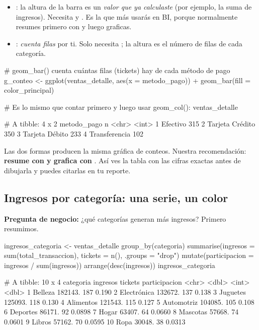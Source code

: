 \begin{itemize}
  \item {}: la altura de la barra es un \emph{valor que ya
        calculaste} (por ejemplo, la suma de ingresos). Necesita 
        y . Es la que más usarás en BI, porque normalmente
        resumes primero con  y luego graficas.
  \item {}: \emph{cuenta filas} por ti. Solo necesita
        ; la altura es el número de filas de cada categoría.
\end{itemize}

\begin{rcode}
# geom_bar() cuenta cuántas filas (tickets) hay de cada método de pago
g_conteo <- ggplot(ventas_detalle, aes(x = metodo_pago)) +
  geom_bar(fill = color_principal)

# Es lo mismo que contar primero y luego usar geom_col():
ventas_detalle %
\end{rcode}
\begin{rsalida}
# A tibble: 4 x 2
  metodo_pago         n
  <chr>           <int>
1 Efectivo          315
2 Tarjeta Crédito   350
3 Tarjeta Débito    233
4 Transferencia     102
\end{rsalida}

Las dos formas producen la misma gráfica de conteos. Nuestra recomendación:
\textbf{resume con  y grafica con }. Así
ves la tabla con las cifras exactas antes de dibujarla y puedes citarlas en
tu reporte.

\subsection{Ingresos por categoría: una serie, un color}

\textbf{Pregunta de negocio:} ¿qué categorías generan más ingresos?
Primero resumimos.

\begin{rcode}
ingresos_categoria <- ventas_detalle %
  group_by(categoria) %
  summarise(ingresos = sum(total_transaccion),
            tickets  = n(),
            .groups  = "drop") %
  mutate(participacion = ingresos / sum(ingresos)) %
  arrange(desc(ingresos))
ingresos_categoria
\end{rcode}
\begin{rsalida}
# A tibble: 10 x 4
   categoria   ingresos tickets participacion
   <chr>          <dbl>   <int>         <dbl>
 1 Belleza      182143.     187        0.190 
 2 Electrónica  132672.     137        0.138 
 3 Juguetes     125093.     118        0.130 
 4 Alimentos    121543.     115        0.127 
 5 Automotriz   104085.     105        0.108 
 6 Deportes      86171.      92        0.0898
 7 Hogar         63407.      64        0.0660
 8 Mascotas      57668.      74        0.0601
 9 Libros        57162.      70        0.0595
10 Ropa          30048.      38        0.0313
\end{rsalida}

